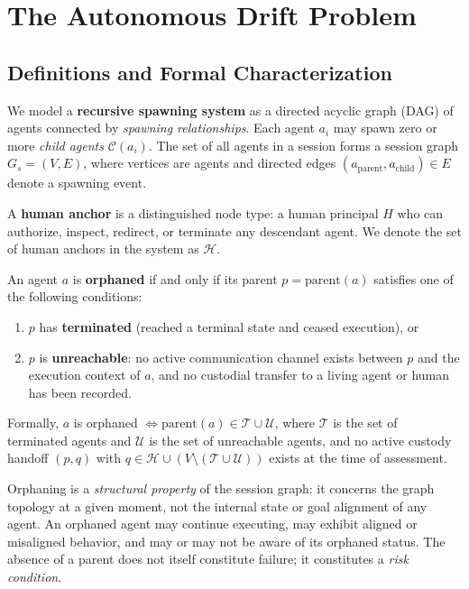 \section{The Autonomous Drift Problem}

\subsection{Definitions and Formal Characterization}

We model a \textbf{recursive spawning system} as a directed acyclic graph (DAG) of agents connected by \textit{spawning relationships}. Each agent $a_i$ may spawn zero or more \textit{child agents} $\mathcal{C}(a_i)$. The set of all agents in a session forms a session graph $G_s = (V, E)$, where vertices are agents and directed edges $(a_{\text{parent}}, a_{\text{child}}) \in E$ denote a spawning event.

A \textbf{human anchor} is a distinguished node type: a human principal $H$ who can authorize, inspect, redirect, or terminate any descendant agent. We denote the set of human anchors in the system as $\mathcal{H}$.

\begin{definition}
An agent $a$ is \textbf{orphaned} if and only if its parent $p = \text{parent}(a)$ satisfies one of the following conditions:
\begin{enumerate}
    \item $p$ has \textbf{terminated} (reached a terminal state and ceased execution), or
    \item $p$ is \textbf{unreachable}: no active communication channel exists between $p$ and the execution context of $a$, and no custodial transfer to a living agent or human has been recorded.
\end{enumerate}
Formally, $a$ is orphaned $\iff \text{parent}(a) \in \mathcal{T} \cup \mathcal{U}$, where $\mathcal{T}$ is the set of terminated agents and $\mathcal{U}$ is the set of unreachable agents, and no active custody handoff $(p, q)$ with $q \in \mathcal{H} \cup (V \setminus (\mathcal{T} \cup \mathcal{U}))$ exists at the time of assessment.
\end{definition}

Orphaning is a \textit{structural property} of the session graph: it concerns the graph topology at a given moment, not the internal state or goal alignment of any agent. An orphaned agent may continue executing, may exhibit aligned or misaligned behavior, and may or may not be aware of its orphaned status. The absence of a parent does not itself constitute failure; it constitutes a \textit{risk condition}.

